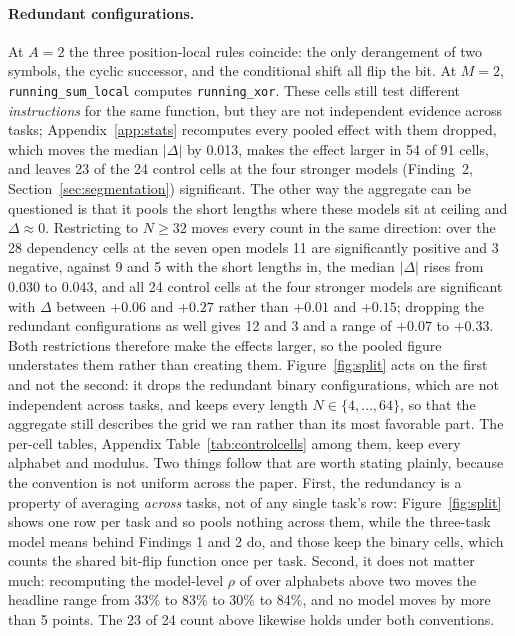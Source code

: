 \documentclass[10pt]{article} %
\newcommand{\task}[1]{\texttt{#1}}
\begin{document}
\paragraph{Redundant configurations.} At $A = 2$ the three position-local rules coincide: the only derangement of two symbols, the cyclic successor, and the conditional shift all flip the bit. At $M = 2$, \task{running\_sum\_local} computes \task{running\_xor}. These cells still test different \emph{instructions} for the same function, but they are not independent evidence across tasks; Appendix~\ref{app:stats} recomputes every pooled effect with them dropped, which moves the median $|\Delta|$ by 0.013, makes the effect larger in 54 of 91 cells, and leaves 23 of the 24 control cells at the four stronger models (Finding~2, Section~\ref{sec:segmentation}) significant. The other way the aggregate can be questioned is that it pools the short lengths where these models sit at ceiling and $\Delta \approx 0$. Restricting to $N \ge 32$ moves every count in the same direction: over the 28 dependency cells at the seven open models 11 are significantly positive and 3 negative, against 9 and 5 with the short lengths in, the median $|\Delta|$ rises from 0.030 to 0.043, and all 24 control cells at the four stronger models are significant with $\Delta$ between $+0.06$ and $+0.27$ rather than $+0.01$ and $+0.15$; dropping the redundant configurations as well gives 12 and 3 and a range of $+0.07$ to $+0.33$. Both restrictions therefore make the effects larger, so the pooled figure understates them rather than creating them. Figure~\ref{fig:split} acts on the first and not the second: it drops the redundant binary configurations, which are not independent across tasks, and keeps every length $N \in \{4, \dots, 64\}$, so that the aggregate still describes the grid we ran rather than its most favorable part. The per-cell tables, Appendix Table~\ref{tab:controlcells} among them, keep every alphabet and modulus. Two things follow that are worth stating plainly, because the convention is not uniform across the paper. First, the redundancy is a property of averaging \emph{across} tasks, not of any single task's row: Figure~\ref{fig:split} shows one row per task and so pools nothing across them, while the three-task model means behind Findings 1 and 2 do, and those keep the binary cells, which counts the shared bit-flip function once per task. Second, it does not matter much: recomputing the model-level $\rho$ of  over alphabets above two moves the headline range from 33\% to 83\% to 30\% to 84\%, and no model moves by more than 5 points. The 23 of 24 count above likewise holds under both conventions.
\end{document}
